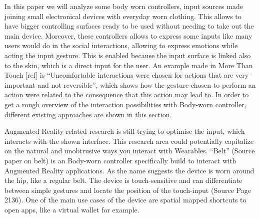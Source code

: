 \documentclass{sigchi}
\begin{document}
In this paper we will analyze some body worn controllers, input sources made joining small electronical devices with everyday worn clothing. This allows to have bigger controlling surfaces ready to be used without  needing to take out the main device. Moreover, these controllers allows to express some inputs like many users would do in the social interactions, allowing to express emotions while acting the input gesture. This is enabled because the input surface is linked also to the skin, which is a direct input for the user. An example made in More Than Touch [ref] is “Uncomfortable interactions were chosen for actions that are very important and not reversible”, which shows how the gesture chosen to perform an action were related to the consequence that this action may lead to. In order to get a rough overview of the interaction possibilities with Body-worn controller, different existing approaches are shown in this section.

Augmented Reality related research is still trying to optimise the input, which interacts with the shown interface. This research area could potentially capitalize on the natural and unobtrusive ways you interact with Wearables.
“Belt” (Source paper on belt) is an Body-worn controller specifically build to interact with Augmented Reality applications. As the name suggests the device is worn around the hip, like a regular belt. The device is touch-sensitive and can differentiate between simple gestures and locate the position of the touch-input (Source Page 2136). One of the main use cases of the device are spatial mapped shortcuts to open apps, like a virtual wallet for example.
\end{document}
